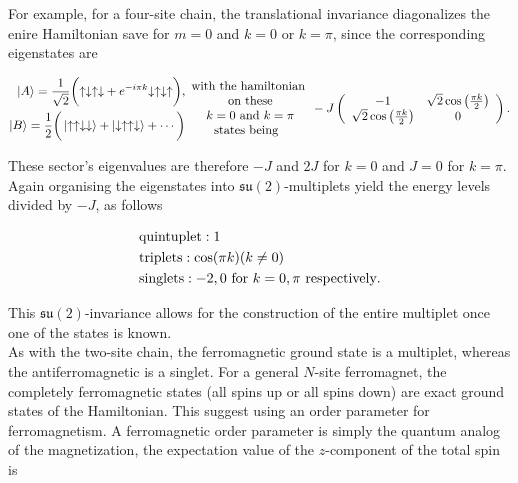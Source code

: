 \documentclass{homework}
\begin{document}
For example, for a four-site chain, the translational invariance diagonalizes the enire Hamiltonian save for $m=0$ and $k = 0$ or $k = \pi$, since the corresponding eigenstates are 

\begin{equation}
    \begin{split}
        \ket{A} = \frac{1}{\sqrt{2}} \bigg({\uparrow\downarrow\uparrow\downarrow} + e^{-i\pi k} {\downarrow\uparrow\downarrow\uparrow}\bigg), \\
        \ket{B} = \frac{1}{2}  \bigg(\ket{{\uparrow\uparrow\downarrow\downarrow}} + \ket{\downarrow \uparrow \uparrow \downarrow} + \cdots \bigg)
    \end{split} \begin{array}{c}
         \textnormal{with the hamiltonian} \\ \textnormal{ on these} \\ \textnormal{ $k=0$ and $k=\pi$} \\ \textnormal{states being }  
    \end{array}-J \left(\begin{array}{cc}
        -1 & \sqrt{2} \cos\left(\frac{\pi k}{2}\right)  \\
        \sqrt{2} \cos\left(\frac{\pi k}{2}\right) & 0
    \end{array}\right).
\end{equation}

These sector's eigenvalues are therefore $-J$ and $2J$ for $k=0$ and $J = 0$ for $k=\pi$. Again organising the eigenstates into $\mathfrak{su}(2)$-multiplets yield the energy levels divided by $-J$, as follows 

\begin{equation}
    \begin{split}
        & \textnormal{quintuplet}: 1 \\
        & \textnormal{triplets}: \cos(\pi k) (k \neq 0) \\
        & \textnormal{singlets}: -2,0 \textnormal{ for } k=0, \pi \textnormal{ respectively}. 
    \end{split}
\end{equation}

This $\mathfrak{su}(2)$-invariance allows for the construction of the entire multiplet once one of the states is known. \\

As with the two-site chain, the ferromagnetic ground state is a multiplet, whereas the antiferromagnetic is a singlet. For a general $N$-site ferromagnet, the completely ferromagnetic states (all spins up or all spins down) are exact ground states of the Hamiltonian. This suggest using an order parameter for ferromagnetism. A ferromagnetic order parameter is simply the quantum analog of the magnetization, the expectation value of the $z$-component of the total spin is 
\end{document}
